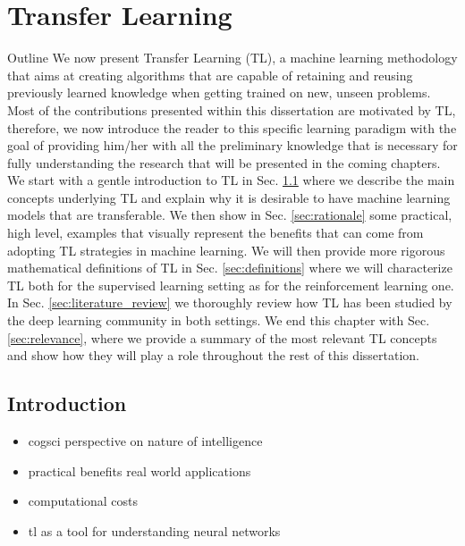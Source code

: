 \chapter{Transfer Learning}
\label{ch:transfer_learnimg}

\begin{remark}{Outline}
	We now present Transfer Learning (TL), a machine learning methodology that aims at creating algorithms that are capable of retaining and reusing previously learned knowledge when getting trained on new, unseen problems. Most of the contributions presented within this dissertation are motivated by TL, therefore, we now introduce the reader to this specific learning paradigm with the goal of providing him/her with all the preliminary knowledge that is necessary for fully understanding the research that will be presented in the coming chapters. We start with a gentle introduction to TL in Sec. \ref{sec:tl_introduction} where we describe the main concepts underlying TL and explain why it is desirable to have machine learning models that are transferable. We then show in Sec. \ref{sec:rationale} some practical, high level, examples that visually represent the benefits that can come from adopting TL strategies in machine learning. We will then provide more rigorous mathematical definitions of TL in Sec. \ref{sec:definitions} where we will characterize TL both for the supervised learning setting as for the reinforcement learning one. In Sec. \ref{sec:literature_review} we thoroughly review how TL has been studied by the deep learning community in both settings. We end this chapter with Sec. \ref{sec:relevance}, where we provide a summary of the most relevant TL concepts and show how they will play a role throughout the rest of this dissertation.  
\end{remark}

\section{Introduction}
\label{sec:tl_introduction}

\begin{itemize}
	\item cogsci perspective on nature of intelligence
	\item practical benefits real world applications
	\item computational costs 
	\item tl as a tool for understanding neural networks
\end{itemize}



